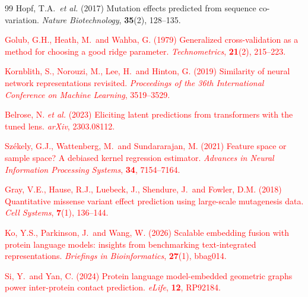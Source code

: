 \documentclass[numbered,webpdf,modern,large]{oup-authoring-template}
\newcommand{\rev}[1]{\textcolor{red}{#1}}
\begin{document}
\begin{thebibliography}{99}
Hopf, T.A.\ \textit{et al.} (2017)
Mutation effects predicted from sequence co-variation.
\textit{Nature Biotechnology}, \textbf{35}(2), 128--135.

\rev{Golub, G.H., Heath, M.\ and Wahba, G. (1979)
Generalized cross-validation as a method for choosing a good ridge parameter.
\textit{Technometrics}, \textbf{21}(2), 215--223.}

\rev{Kornblith, S., Norouzi, M., Lee, H.\ and Hinton, G. (2019)
Similarity of neural network representations revisited.
\textit{Proceedings of the 36th International Conference on Machine Learning},
3519--3529.}

\rev{Belrose, N. \textit{et al.} (2023)
Eliciting latent predictions from transformers with the tuned lens.
\textit{arXiv}, 2303.08112.}


\rev{Sz\'ekely, G.J., Wattenberg, M.\ and Sundararajan, M. (2021)
Feature space or sample space? A debiased kernel regression estimator.
\textit{Advances in Neural Information Processing Systems}, \textbf{34},
7154--7164.}

\rev{Gray, V.E., Hause, R.J., Luebeck, J., Shendure, J.\ and Fowler, D.M. (2018)
Quantitative missense variant effect prediction using large-scale mutagenesis data.
\textit{Cell Systems}, \textbf{7}(1), 136--144.}

\rev{Ko, Y.S., Parkinson, J.\ and Wang, W. (2026)
Scalable embedding fusion with protein language models: insights from
benchmarking text-integrated representations.
\textit{Briefings in Bioinformatics}, \textbf{27}(1), bbag014.}

\rev{Si, Y.\ and Yan, C. (2024)
Protein language model-embedded geometric graphs power inter-protein contact
prediction.
\textit{eLife}, \textbf{12}, RP92184.}

\end{thebibliography}
\end{document}
